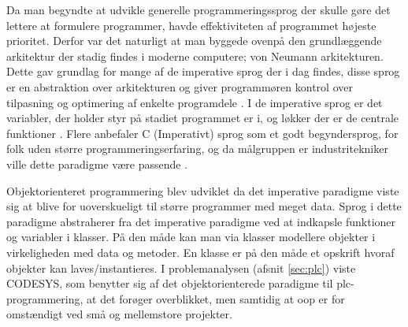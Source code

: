 \label{sec:c_is_easy2}
Da man begyndte at udvikle generelle programmeringssprog der skulle gøre det lettere at formulere programmer, havde effektiviteten af programmet højeste prioritet. Derfor var det naturligt at man byggede ovenpå den grundlæggende arkitektur der stadig findes i moderne computere; von Neumann arkitekturen. Dette gav grundlag for mange af de imperative sprog der i dag findes, disse sprog er en abstraktion over arkitekturen og giver programmøren kontrol over tilpasning og optimering af enkelte programdele \cite[38-39]{Sebesta_2013}. I de imperative sprog er det variabler, der holder styr på stadiet programmet er i, og løkker der er de centrale funktioner \cite{Sebesta_2013}. Flere anbefaler C (Imperativt) sprog som et godt begyndersprog, for folk uden større programmeringserfaring, og da målgruppen er industritekniker ville dette paradigme være passende \cite{c_is_easy}.

Objektorienteret programmering blev udviklet da det imperative paradigme viste sig at blive for uoverskueligt til større programmer med meget data. Sprog i dette paradigme abstraherer fra det imperative paradigme ved at indkapsle funktioner og variabler i klasser. På den måde kan man via klasser modellere objekter i virkeligheden med data og metoder. En klasse er på den måde et opskrift hvoraf objekter kan laves/instantieres. I problemanalysen (afsnit \ref{sec:plc}) viste CODESYS, som benytter sig af det objektorienterede paradigme til \gls{plc}-programmering, at det forøger overblikket, men samtidig at \gls{oop} er for omstændigt ved små og mellemstore projekter.


